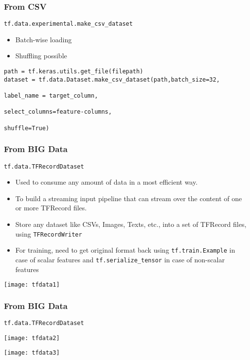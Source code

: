 \begin{frame}[fragile]\frametitle{From CSV}
\lstinline|tf.data.experimental.make_csv_dataset|

\begin{itemize}
\item Batch-wise loading
\item Shuffling possible
\end{itemize}

\begin{lstlisting}
path = tf.keras.utils.get_file(filepath)
dataset = tf.data.Dataset.make_csv_dataset(path,batch_size=32,
																						label_name = target_column,
																						select_columns=feature-columns,
																						shuffle=True)
\end{lstlisting}
\end{frame}

\begin{frame}[fragile]\frametitle{From BIG Data}
\lstinline|tf.data.TFRecordDataset|

\begin{itemize}
\item Used to consume any amount of data in a most efficient way.
\item To build a streaming input pipeline that can stream over the content of one or more TFRecord files.
\item Store any dataset like CSVs, Images, Texts, etc., into a set of TFRecord files, using \lstinline|TFRecordWriter|
\item For training, need to get original format back using \lstinline|tf.train.Example| in case of scalar features and \lstinline|tf.serialize_tensor| in case of non-scalar features
\end{itemize}

\begin{center}
\texttt{[image: tfdata1]}
\end{center}
\end{frame}

\begin{frame}[fragile]\frametitle{From BIG Data}
\lstinline|tf.data.TFRecordDataset|

\begin{center}
\texttt{[image: tfdata2]}

\texttt{[image: tfdata3]}


\end{center}
\end{frame}

